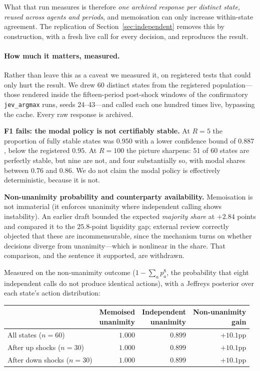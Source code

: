 \documentclass[11pt]{article}
\begin{document}
What that run measures is therefore
\emph{one archived response per distinct state, reused across agents and
periods}, and memoisation can only increase within-state agreement. The replication of Section~\ref{sec:independent}
removes this by construction, with a fresh live call for every decision, and
reproduces the result.

\paragraph{How much it matters, measured.} Rather than leave this as a caveat
we measured it, on registered tests that could only hurt the result. We drew 60
distinct states from the registered population---those rendered inside the
fifteen-period post-shock windows of the confirmatory \texttt{jev\_argmax}
runs, seeds 24--43---and called each one hundred times live, bypassing the
cache. Every raw response is archived.

\textbf{F1 fails: the modal policy is not certifiably stable.} At $R=5$ the
proportion of fully stable states was $0.950$ with a lower confidence bound of
$0.887$, below the registered $0.95$. At $R=100$ the picture sharpens: $51$ of
$60$ states are perfectly stable, but nine are not, and four substantially so,
with modal shares between $0.76$ and $0.86$. We do not claim the modal policy
is effectively deterministic, because it is not.

\textbf{Non-unanimity probability and counterparty availability.}
Memoisation is not immaterial (it enforces unanimity where
independent calling shows instability). An earlier draft bounded the expected
\emph{majority share} at $+2.84$ points and compared it to the $25.8$-point
liquidity gap; external review correctly objected that these are
incommensurable, since the mechanism turns on whether decisions diverge from
unanimity---which is nonlinear in the share. That comparison, and the sentence
it supported, are withdrawn.

Measured on the non-unanimity outcome ($1-\sum_a p_a^8$, the probability that
eight independent calls do not produce identical actions), with a Jeffreys
posterior over each state's action distribution:

\begin{center}
\begin{tabular}{lrrr}
\toprule
& \shortstack{Memoised\\unanimity} & \shortstack{Independent\\unanimity} & \shortstack{Non-unanimity\\gain} \\
\midrule
All states ($n=60$)        & $1.000$ & $0.899$ & $+10.1$pp \\
After up shocks ($n=30$)   & $1.000$ & $0.899$ & $+10.1$pp \\
After down shocks ($n=30$) & $1.000$ & $0.899$ & $+10.1$pp \\
\bottomrule
\end{tabular}
\end{center}
\end{document}
